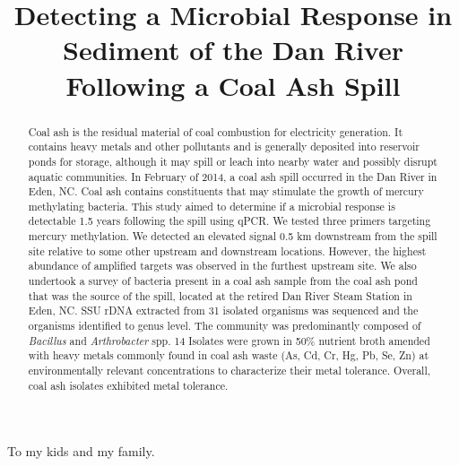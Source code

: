 \documentclass[ms, hidelinks]{uncgdissertationexp}
\title{Detecting a Microbial Response in Sediment of the Dan River Following a Coal Ash Spill}
\theoremstyle{plain}
\theoremstyle{definition}
\theoremstyle{remark}
\begin{document}
\frontmatter      %

\begin{abstract}
Coal ash is the residual material of coal combustion for electricity generation. It contains heavy metals and other pollutants and is generally deposited into reservoir ponds for storage, although it may spill or leach into nearby water and possibly disrupt aquatic communities. In February of 2014, a coal ash spill occurred in the Dan River in Eden, NC. Coal ash contains constituents that may stimulate the growth of mercury methylating bacteria. This study aimed to determine if a microbial response is detectable 1.5 years following the spill using qPCR. We tested three primers targeting mercury methylation. We detected an elevated signal 0.5 km downstream from the spill site relative to some other upstream and downstream locations. However, the highest abundance of amplified targets was observed in the furthest upstream site. We also undertook a survey of bacteria present in a coal ash sample from the coal ash pond that was the source of the spill, located at the retired Dan River Steam Station in Eden, NC. SSU rDNA extracted from 31 isolated organisms was sequenced and the organisms identified to genus level. The community was predominantly composed of \emph{Bacillus} and \emph{Arthrobacter} spp. 14 Isolates were grown in 50\% nutrient broth amended with heavy metals commonly found in coal ash waste (As, Cd, Cr, Hg, Pb, Se, Zn) at environmentally relevant concentrations to characterize their metal tolerance. Overall, coal ash isolates exhibited metal tolerance.
\end{abstract}
\maketitlepage


\begin{dedication}
  To my kids and my family.
\end{dedication}
\makeapprovalpage
\end{document}
